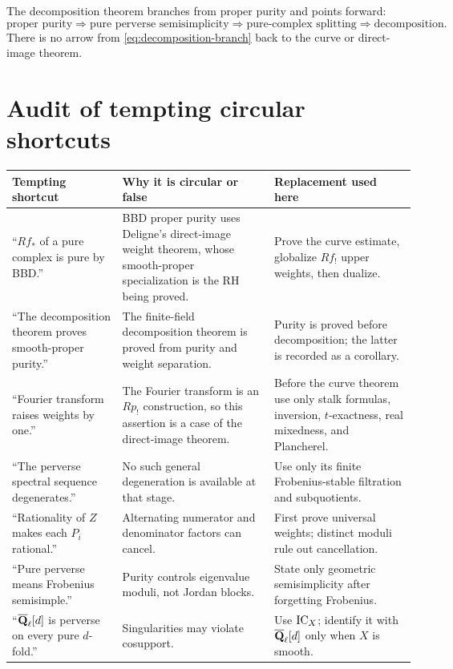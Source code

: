 The decomposition theorem branches from proper purity and points forward:
\[
  \text{proper purity}
  \Longrightarrow
  \text{pure perverse semisimplicity}
  \Longrightarrow
  \text{pure-complex splitting}
  \Longrightarrow
  \text{decomposition}.
\tag{B.2}\label{eq:decomposition-branch}
\]
There is no arrow from \eqref{eq:decomposition-branch} back to the curve or
direct-image theorem.

\section{Audit of tempting circular shortcuts}

\begin{longtable}{
 >{\raggedright\arraybackslash}p{}
 >{\raggedright\arraybackslash}p{}
 >{\raggedright\arraybackslash}p{}}
\toprule
Tempting shortcut & Why it is circular or false & Replacement used here\\
\midrule
\endhead
“\(Rf_*\) of a pure complex is pure by BBD.” &
BBD proper purity uses Deligne's direct-image weight theorem, whose
smooth-proper specialization is the RH being proved. &
Prove the curve estimate, globalize \(Rf_!\) upper weights, then dualize.\\

“The decomposition theorem proves smooth-proper purity.” &
The finite-field decomposition theorem is proved from purity and weight
separation. &
Purity is proved before decomposition; the latter is recorded as a
corollary.\\

“Fourier transform raises weights by one.” &
The Fourier transform is an \(Rp_!\) construction, so this assertion is a
case of the direct-image theorem. &
Before the curve theorem use only stalk formulas, inversion,
\(t\)-exactness, real mixedness, and Plancherel.\\

“The perverse spectral sequence degenerates.” &
No such general degeneration is available at that stage. &
Use only its finite Frobenius-stable filtration and subquotients.\\

“Rationality of \(Z\) makes each \(P_i\) rational.” &
Alternating numerator and denominator factors can cancel. &
First prove universal weights; distinct moduli rule out cancellation.\\

“Pure perverse means Frobenius semisimple.” &
Purity controls eigenvalue moduli, not Jordan blocks. &
State only geometric semisimplicity after forgetting Frobenius.\\

“\(\overline{\mathbf Q}_\ell[d]\) is perverse on every pure \(d\)-fold.” &
Singularities may violate cosupport. &
Use \(\operatorname{IC}_X\); identify it with \(\overline{\mathbf Q}_\ell[d]\) only when \(X\) is smooth.\\
\bottomrule
\end{longtable}

